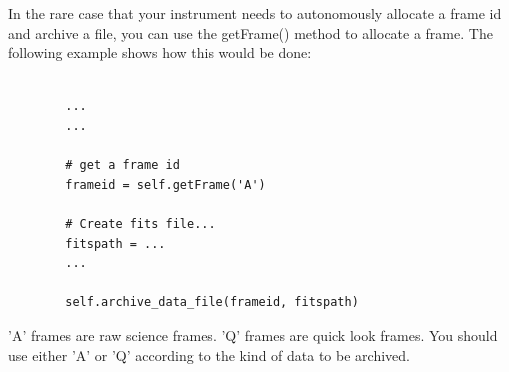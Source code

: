\documentclass[11pt]{report}
\begin{document}
In the rare case that your instrument needs to autonomously allocate a
frame id and archive a file, you can use the getFrame() method to
allocate a frame. The following example shows how this would be done: 
\begin{verbatim}

        ...
        ...

        # get a frame id
        frameid = self.getFrame('A')

        # Create fits file...
        fitspath = ...
        ...

        self.archive_data_file(frameid, fitspath)

\end{verbatim}
'A' frames are raw science frames. 'Q' frames are quick look frames.
You should use either 'A' or 'Q' according to the kind of data
to be archived. 
\end{document}
